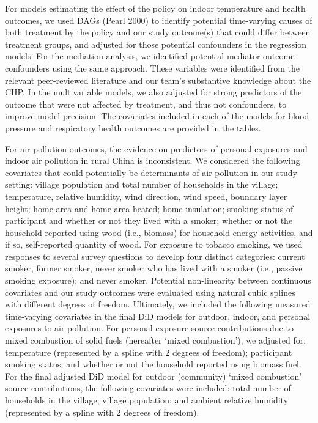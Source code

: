 \documentclass[
  letterpaper,
  DIV=11,
  numbers=noendperiod]{scrartcl}
\begin{document}
For models estimating the effect of the policy on indoor temperature and
health outcomes, we used DAGs (Pearl 2000) to identify potential
time-varying causes of both treatment by the policy and our study
outcome(s) that could differ between treatment groups, and adjusted for
those potential confounders in the regression models. For the mediation
analysis, we identified potential mediator-outcome confounders using the
same approach. These variables were identified from the relevant
peer-reviewed literature and our team's substantive knowledge about the
CHP. In the multivariable models, we also adjusted for strong predictors
of the outcome that were not affected by treatment, and thus not
confounders, to improve model precision. The covariates included in each
of the models for blood pressure and respiratory health outcomes are
provided in the tables.

For air pollution outcomes, the evidence on predictors of personal
exposures and indoor air pollution in rural China is inconsistent. We
considered the following covariates that could potentially be
determinants of air pollution in our study setting: village population
and total number of households in the village; temperature, relative
humidity, wind direction, wind speed, boundary layer height; home area
and home area heated; home insulation; smoking status of participant and
whether or not they lived with a smoker; whether or not the household
reported using wood (i.e., biomass) for household energy activities, and
if so, self-reported quantity of wood. For exposure to tobacco smoking,
we used responses to several survey questions to develop four distinct
categories: current smoker, former smoker, never smoker who has lived
with a smoker (i.e., passive smoking exposure); and never smoker.
Potential non-linearity between continuous covariates and our study
outcomes were evaluated using natural cubic splines with different
degrees of freedom. Ultimately, we included the following measured
time-varying covariates in the final DiD models for outdoor, indoor, and
personal exposures to air pollution. For personal exposure source
contributions due to mixed combustion of solid fuels (hereafter `mixed
combustion'), we adjusted for: temperature (represented by a spline with
2 degrees of freedom); participant smoking status; and whether or not
the household reported using biomass fuel. For the final adjusted DiD
model for outdoor (community) `mixed combustion' source contributions,
the following covariates were included: total number of households in
the village; village population; and ambient relative humidity
(represented by a spline with 2 degrees of freedom).
\end{document}
